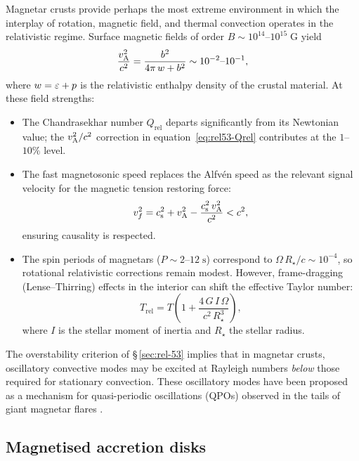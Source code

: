 Magnetar crusts provide perhaps the most extreme environment in which the
interplay of rotation, magnetic field, and thermal convection operates in
the relativistic regime.  Surface magnetic fields of order
$B\sim 10^{14}$--$10^{15}\;\mathrm{G}$ yield
\begin{equation}
  \frac{v_{\mathrm{A}}^{2}}{c^{2}}
  = \frac{b^{2}}{4\pi\,w + b^{2}}
  \sim 10^{-2}\text{--}10^{-1},
  \label{eq:rel54-vA-magnetar}
\end{equation}
where $w = \varepsilon+p$ is the relativistic enthalpy
density of the crustal material.  At these field strengths:
\begin{itemize}
  \item The Chandrasekhar number $Q_{\mathrm{rel}}$ departs significantly
    from its Newtonian value; the $v_{\mathrm{A}}^{2}/c^{2}$ correction in
    equation~\eqref{eq:rel53-Qrel} contributes at the $1$--$10\%$ level.
  \item The fast magnetosonic speed replaces the Alfv\'en speed as the
    relevant signal velocity for the magnetic tension restoring force:
    \begin{equation}
      v_f^{2} = c_{\mathrm{s}}^{2} + v_{\mathrm{A}}^{2} - \frac{c_{\mathrm{s}}^{2}\,v_{\mathrm{A}}^{2}}{c^{2}}
      < c^{2},
      \label{eq:rel54-vfast}
    \end{equation}
    ensuring causality is respected.
  \item The spin periods of magnetars ($P\sim 2$--$12\;\mathrm{s}$)
    correspond to $\Omega\,R_{\star}/c\sim 10^{-4}$, so rotational
    relativistic corrections remain modest.  However, frame-dragging
    (Lense--Thirring) effects in the interior can shift the effective
    Taylor number:
    \begin{equation}
      T_{\mathrm{rel}} = T\!\left(1
      + \frac{4\,G\,I\,\Omega}{c^{2}\,R_{\star}^{3}}\right),
      \label{eq:rel54-T-framedrag}
    \end{equation}
    where $I$ is the stellar moment of inertia and $R_{\star}$ the stellar
    radius.
\end{itemize}

The overstability criterion of \S\,\ref{sec:rel-53} implies that in
magnetar crusts, oscillatory convective modes may be excited at Rayleigh
numbers \emph{below} those required for stationary convection.  These
oscillatory modes have been proposed as a mechanism for quasi-periodic
oscillations (QPOs) observed in the tails of giant magnetar flares
\citep{Israel2005,Strohmayer2005,Watts2006}.

\subsection{Magnetised accretion disks}

